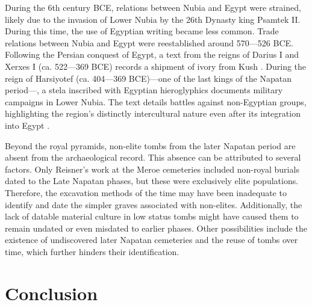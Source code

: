 During the 6th century BCE, relations between Nubia and Egypt were strained, likely due to the invasion of Lower Nubia by the 26th Dynasty king Psamtek II. During this time, the use of Egyptian writing became less common. Trade relations between Nubia and Egypt were reestablished around 570---526 BCE. Following the Persian conquest of Egypt, a text from the reigns of Darius I and Xerxes I (ca. 522---369 BCE) records a shipment of ivory from Kush \parencite[p.~364-365]{törökTwoWorldsFrontier2009}. During the reign of Harsiyotef (ca. 404---369 BCE)---one of the last kings of the Napatan period---, a stela inscribed with Egyptian hieroglyphics documents military campaigns in Lower Nubia. The text details battles against non-Egyptian groups, highlighting the region's distinctly intercultural nature even after its integration into Egypt \parencites[p.~344-345, 344-345, 376-377]{törökKingdomKushHandbook1997}[p.~361-370]{törökTwoWorldsFrontier2009}[p.~498-499]{howleyKushitesEgypt6642020}.


Beyond the royal pyramids, non-elite tombs from the later Napatan period are absent from the archaeological record. This absence can be attributed to several factors. Only Reisner's work at the Meroe cemeteries included non-royal burials dated to the Late Napatan phases, but these were exclusively elite populations. Therefore, the excavation methods of the time may have been inadequate to identify and date the simpler graves associated with non-elites. Additionally, the lack of datable material culture in low status tombs might have caused them to remain undated or even misdated to earlier phases. Other possibilities include the existence of undiscovered later Napatan cemeteries and the reuse of tombs over time, which further hinders their identification.


\section{Conclusion}


